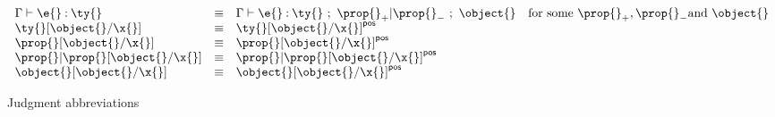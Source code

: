 \begin{figure}
$$
\begin{array}{lllr}
  \judgementtwo{\propenv{}}{\e{}}{\ty{}} &\equiv& 
  \judgement{\propenv{}}{\e{}}{\ty{}}{\filterset{\thenprop{\prop{}}}{\elseprop{\prop{}}}}{\object{}}
  & \text{for some}\ {\thenprop{\prop{}}}, {\elseprop{\prop{}}} \text{and}\ {\object{}}

  \\
  {\replacefor{\ty{}}{\object{}}{\x{}}} &\equiv& {\pluspolarity{\replacefor{\ty{}}{\object{}}{\x{}}}}
  \\
  {\replacefor{\prop{}}{\object{}}{\x{}}} &\equiv&  {\pluspolarity{\replacefor{\prop{}}{\object{}}{\x{}}}}
  \\
  {\replacefor{\filterset{\prop{}}{\prop{}}}{\object{}}{\x{}}} &\equiv&  {\pluspolarity{\replacefor{\filterset{\prop{}}{\prop{}}}{\object{}}{\x{}}}}
  \\
  {\replacefor{\object{}}{\object{}}{\x{}}} &\equiv& {\pluspolarity{\replacefor{\object{}}{\object{}}{\x{}}}}

\end{array}
$$
\caption{Judgment abbreviations}
\end{figure}
